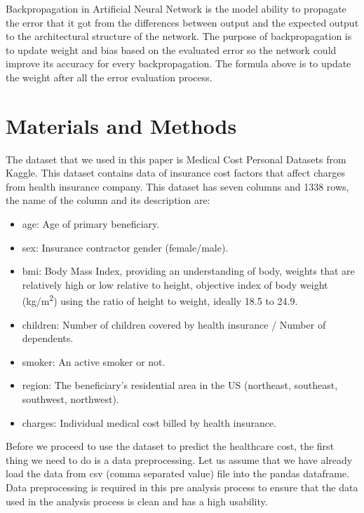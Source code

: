 \documentclass[a4paper, 12pt]{article}
\begin{document}
\begin{multicols}{2}
\justifying
  Backpropagation in Artificial Neural Network is the model ability to propagate the error that it got from the differences between output and the expected output to the architectural structure of the network. The purpose of backpropagation is to update weight and bias based on the evaluated error so the network could improve its accuracy for every backpropagation. The formula above is to update the weight after all the error evaluation process. \cite{erb1993}

\section{Materials and Methods}
The dataset that we used in this paper is Medical Cost Personal Datasets from Kaggle. This dataset contains data of insurance cost factors that affect charges from health insurance company. This dataset has seven columns and 1338 rows, the name of the column and its description are:
  \begin{itemize}
    \item age: Age of primary beneficiary.
    \item sex: Insurance contractor gender (female/male).
    \item bmi: Body Mass Index, providing an understanding of body, weights that are relatively high or low relative to height, objective index of body weight (kg/m\textsuperscript{2}) using the ratio of height to weight, ideally 18.5 to 24.9. 
    \item children: Number of children covered by health insurance / Number of dependents.
    \item smoker: An active smoker or not.
    \item region: The beneficiary's residential area in the US (northeast, southeast, southwest, northwest).
    \item charges: Individual medical cost billed by health insurance.
  \end{itemize}

  Before we proceed to use the dataset to predict the healthcare cost, the first thing we need to do is a data preprocessing. Let us assume that we have already load the data from csv (comma separated value) file into the pandas dataframe. Data preprocessing is required in this pre analysis process to ensure that the data used in the analysis process is clean and has a high usability.  


\end{multicols}
\end{document}
